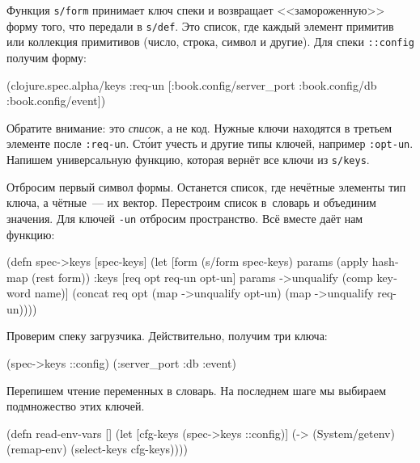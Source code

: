 Функция \verb|s/form| принимает ключ спеки и возвращает <<замороженную>> форму
того, что передали в \verb|s/def|. Это список, где каждый элемент примитив или
коллекция примитивов (число, строка, символ и другие). Для спеки \verb|::config|
получим форму:

\begin{english}
  \begin{clojure}
(clojure.spec.alpha/keys
 :req-un [:book.config/server_port
          :book.config/db
          :book.config/event])
  \end{clojure}
\end{english}


Обратите внимание: это \emph{список}, а не код. Нужные ключи находятся в третьем
элементе после \verb|:req-un|. Ст\'{о}ит учесть и другие типы ключей, например
\verb|:opt-un|. Напишем универсальную функцию, которая вернёт все ключи из
\verb|s/keys|.

Отбросим первый символ формы. Останется список, где нечётные элементы тип ключа,
а чётные~--- их вектор. Перестроим список в~словарь и объединим значения. Для
ключей \verb|-un| отбросим пространство. Всё вместе даёт нам функцию:


\begin{english}
  \begin{clojure}
(defn spec->keys
  [spec-keys]
  (let [form (s/form spec-keys)
        params (apply hash-map (rest form))
        {:keys [req opt req-un opt-un]} params
        ->unqualify (comp keyword name)]
    (concat req
            opt
            (map ->unqualify opt-un)
            (map ->unqualify req-un))))
  \end{clojure}
\end{english}

\noindent
Проверим спеку загрузчика. Действительно, получим три ключа:

\begin{english}
  \begin{clojure}
(spec->keys ::config)
(:server_port :db :event)
  \end{clojure}
\end{english}

\noindent
Перепишем чтение переменных в словарь. На последнем шаге мы выбираем
подмножество этих ключей.

\begin{english}
  \begin{clojure}
(defn read-env-vars []
  (let [cfg-keys (spec->keys ::config)]
    (-> (System/getenv)
        (remap-env)
        (select-keys cfg-keys))))
  \end{clojure}
\end{english}

